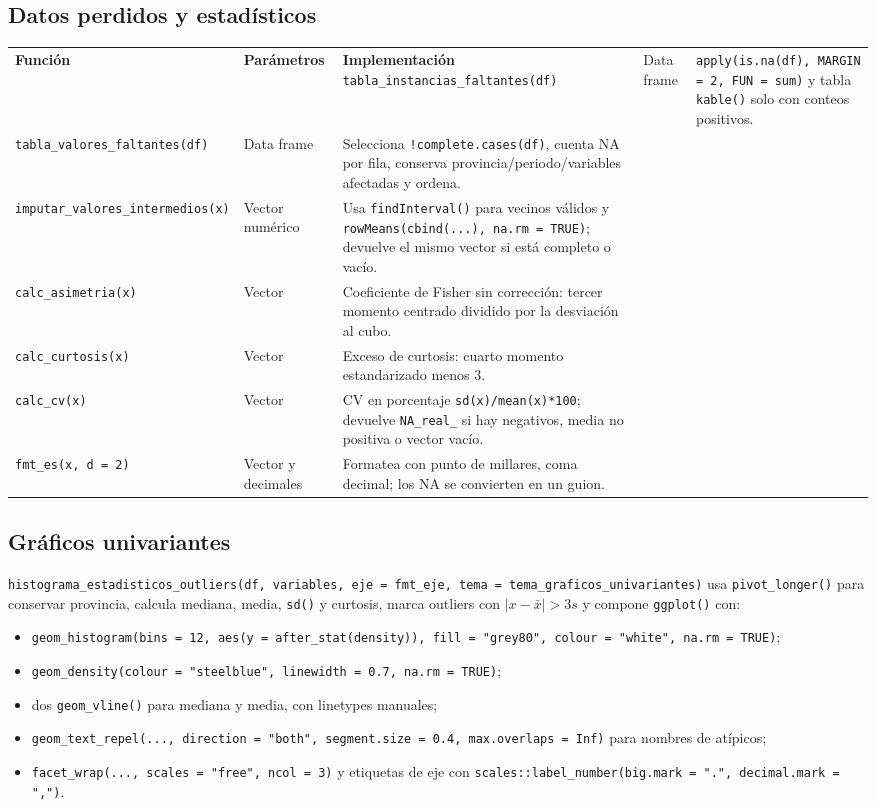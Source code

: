\documentclass[10pt,a4paper]{article}
\newcommand{\code}[1]{\texttt{\small #1}}
\begin{document}
\subsection{Datos perdidos y estadísticos}
\begin{longtable}{p{}p{}p{}}
\toprule\textbf{Función} & \textbf{Parámetros} & \textbf{Implementación}\
\midrule\endhead
\code{tabla\_instancias\_faltantes(df)} & Data frame & \code{apply(is.na(df), MARGIN = 2, FUN = sum)} y tabla \code{kable()} solo con conteos positivos.\\
\code{tabla\_valores\_faltantes(df)} & Data frame & Selecciona \code{!complete.cases(df)}, cuenta NA por fila, conserva provincia/periodo/variables afectadas y ordena.\\
\code{imputar\_valores\_intermedios(x)} & Vector numérico & Usa \code{findInterval()} para vecinos válidos y \code{rowMeans(cbind(...), na.rm = TRUE)}; devuelve el mismo vector si está completo o vacío.\\
\code{calc\_asimetria(x)} & Vector & Coeficiente de Fisher sin corrección: tercer momento centrado dividido por la desviación al cubo.\\
\code{calc\_curtosis(x)} & Vector & Exceso de curtosis: cuarto momento estandarizado menos 3.\\
\code{calc\_cv(x)} & Vector & CV en porcentaje \code{sd(x)/mean(x)*100}; devuelve \code{NA\_real\_} si hay negativos, media no positiva o vector vacío.\\
\code{fmt\_es(x, d = 2)} & Vector y decimales & Formatea con punto de millares, coma decimal; los NA se convierten en un guion.\\
\bottomrule\end{longtable}

\subsection{Gráficos univariantes}
\code{histograma\_estadisticos\_outliers(df, variables, eje = fmt\_eje, tema = tema\_graficos\_univariantes)} usa \code{pivot\_longer()} para conservar provincia, calcula mediana, media, \code{sd()} y curtosis, marca outliers con $|x-\bar{x}|>3s$ y compone \code{ggplot()} con:
\begin{itemize}[leftmargin=1.4em]
\item \code{geom\_histogram(bins = 12, aes(y = after\_stat(density)), fill = "grey80", colour = "white", na.rm = TRUE)};
\item \code{geom\_density(colour = "steelblue", linewidth = 0.7, na.rm = TRUE)};
\item dos \code{geom\_vline()} para mediana y media, con linetypes manuales;
\item \code{geom\_text\_repel(..., direction = "both", segment.size = 0.4, max.overlaps = Inf)} para nombres de atípicos;
\item \code{facet\_wrap(..., scales = "free", ncol = 3)} y etiquetas de eje con \code{scales::label\_number(big.mark = ".", decimal.mark = ",")}.
\end{itemize}
\end{document}
